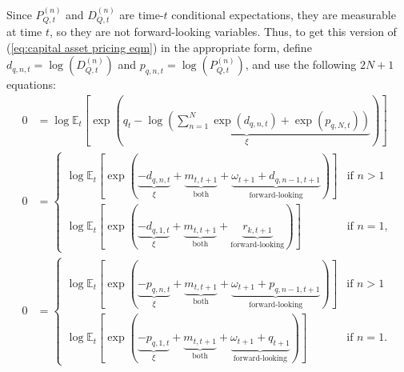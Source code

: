\documentclass[12 pt, oneside]{article}
\theoremstyle{definition}
\theoremstyle{definition}
\theoremstyle{definition}
\newcommand{\E}{\mathbb{E}}
\begin{document}
Since $P_{Q, t}^{(n)}$ and $D_{Q, t}^{(n)}$ are time-$t$ conditional expectations, they are measurable at time $t$, so they are not forward-looking variables. Thus, to get this version of (\ref{eq:capital asset pricing eqm}) in the appropriate form, define $d_{q, n, t} = \log(D_{Q, t}^{(n)})$ and $p_{q, n, t} = \log(P_{Q, t}^{(n)})$, and use the following $2N + 1$ equations:
\begin{align}
  0 & = \log\E_t\left[\exp\left(\underbrace{q_t - \log\left(\sum_{n = 1}^{N}\exp(d_{q, n, t}) + \exp(p_{q, N, t})\right)}_{\xi}\right)\right]\\
  0 & =
      \begin{cases}
        \log\E_t\left[\exp\left(\underbrace{-d_{q, n, t}}_{\xi} + \underbrace{m_{t, t + 1}}_{\text{both}} + \underbrace{\omega_{t + 1} + d_{q, n - 1, t + 1}}_{\text{forward-looking}}\right)\right] & \text{if } n > 1\\
        \log\E_t\left[\exp\left(\underbrace{- d_{q, 1, t}}_{\xi} + \underbrace{m_{t, t + 1}}_{\text{both}} + \underbrace{r_{k, t + 1}}_{\text{forward-looking}} \right)\right] & \text{if } n = 1,
      \end{cases}\\
  0 & =
      \begin{cases}
        \log\E_t\left[\exp\left(\underbrace{-p_{q, n, t}}_{\xi} + \underbrace{m_{t, t + 1}}_{\text{both}} + \underbrace{\omega_{t + 1} + p_{q, n - 1, t + 1}}_{\text{forward-looking}} \right)\right] & \text{if } n > 1\\
        \log\E_t\left[\exp\left(\underbrace{-p_{q, 1, t}}_{\xi} + \underbrace{m_{t, t + 1}}_{\text{both}} + \underbrace{\omega_{t + 1} + q_{t + 1}}_{\text{forward-looking}}\right)\right] & \text{if }n = 1.
      \end{cases}
\end{align}
\end{document}
